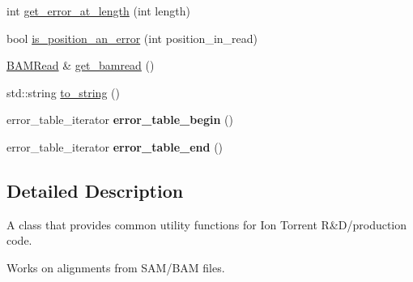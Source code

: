 \begin{DoxyCompactItemize}
\item 
int \hyperlink{class_b_a_m_utils_abaea34a7c2784ffd56b27bd981374d45}{get\_\-error\_\-at\_\-length} (int length)
\item 
bool \hyperlink{class_b_a_m_utils_a4465a52da42272735728285f9fbf5e8c}{is\_\-position\_\-an\_\-error} (int position\_\-in\_\-read)
\item 
\hyperlink{class_b_a_m_read}{BAMRead} \& \hyperlink{class_b_a_m_utils_af76ec0920e92a73a8c60e898330e62f6}{get\_\-bamread} ()
\item 
std::string \hyperlink{class_b_a_m_utils_a20441e66c8002b5dbb1df321c92b7b67}{to\_\-string} ()
\item 
\hypertarget{class_b_a_m_utils_ad0f217c572a93c9457ef9bca9b204748}{
error\_\-table\_\-iterator {\bfseries error\_\-table\_\-begin} ()}
\label{class_b_a_m_utils_ad0f217c572a93c9457ef9bca9b204748}

\item 
\hypertarget{class_b_a_m_utils_a63efa10154474db5ccf3c4e395606b2c}{
error\_\-table\_\-iterator {\bfseries error\_\-table\_\-end} ()}
\label{class_b_a_m_utils_a63efa10154474db5ccf3c4e395606b2c}

\end{DoxyCompactItemize}


\subsection{Detailed Description}
A class that provides common utility functions for Ion Torrent R\&D/production code.

Works on alignments from SAM/BAM files. 

